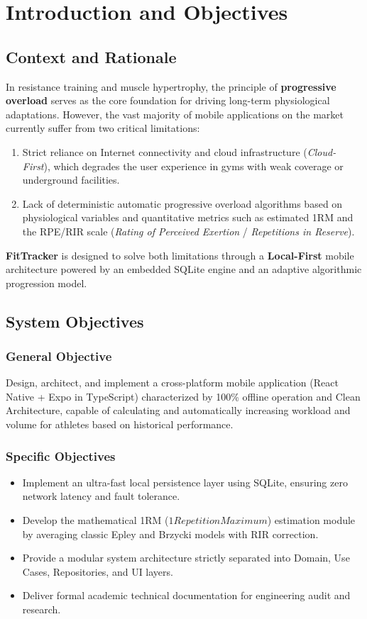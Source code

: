 \section{Introduction and Objectives}

\subsection{Context and Rationale}
In resistance training and muscle hypertrophy, the principle of \textbf{progressive overload} serves as the core foundation for driving long-term physiological adaptations. However, the vast majority of mobile applications on the market currently suffer from two critical limitations:
\begin{enumerate}
    \item Strict reliance on Internet connectivity and cloud infrastructure (\textit{Cloud-First}), which degrades the user experience in gyms with weak coverage or underground facilities.
    \item Lack of deterministic automatic progressive overload algorithms based on physiological variables and quantitative metrics such as estimated 1RM and the RPE/RIR scale (\textit{Rating of Perceived Exertion} / \textit{Repetitions in Reserve}).
\end{enumerate}

\textbf{FitTracker} is designed to solve both limitations through a \textbf{Local-First} mobile architecture powered by an embedded SQLite engine and an adaptive algorithmic progression model.

\subsection{System Objectives}

\subsubsection{General Objective}
Design, architect, and implement a cross-platform mobile application (React Native + Expo in TypeScript) characterized by 100\% offline operation and Clean Architecture, capable of calculating and automatically increasing workload and volume for athletes based on historical performance.

\subsubsection{Specific Objectives}
\begin{itemize}
    \item Implement an ultra-fast local persistence layer using SQLite, ensuring zero network latency and fault tolerance.
    \item Develop the mathematical 1RM ($1Repetition Maximum$) estimation module by averaging classic Epley and Brzycki models with RIR correction.
    \item Provide a modular system architecture strictly separated into Domain, Use Cases, Repositories, and UI layers.
    \item Deliver formal academic technical documentation for engineering audit and research.
\end{itemize}

